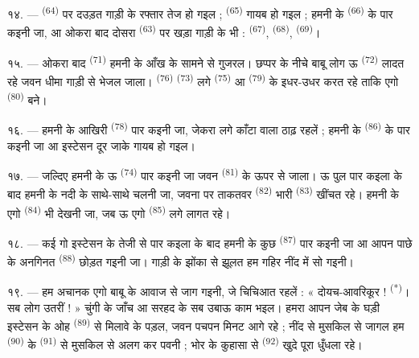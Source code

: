 \VUsaut{3.0mm}
\VUsaut{3.0mm}

१४. ---  \textsuperscript{(64)} पर दउड़त गाड़ी के रफ्तार तेज
हो गइल ;  \textsuperscript{(65)} गायब हो गइल ; हमनी के
 \textsuperscript{(66)} के पार कइनी जा, आ ओकरा बाद दोसरा
 \textsuperscript{(63)} पर खड़ा गाड़ी के भी :  \textsuperscript{(67)}, 
\textsuperscript{(68)},  \textsuperscript{(69)}।


१५. --- ओकरा बाद  \textsuperscript{(71)} हमनी के
आँख के सामने से गुजरल। छप्पर के नीचे बाबू लोग ऊ 
\textsuperscript{(72)} लादत रहे जवन धीमा गाड़ी से भेजल जाला।
 \textsuperscript{(76)} 
\textsuperscript{(73)} लगे  \textsuperscript{(75)} आ
 \textsuperscript{(79)} के इधर-उधर करत रहे ताकि एगो
 \textsuperscript{(80)} बने।

१६. --- हमनी के आखिरी  \textsuperscript{(78)} पार कइनी जा,
जेकरा लगे काँटा वाला ठाढ़ रहलें ; हमनी के 
\textsuperscript{(86)} के पार कइनी जा आ इस्टेसन दूर जाके गायब हो गइल।

१७. --- जल्दिए हमनी के ऊ  \textsuperscript{(74)} पार
कइनी जा जवन  \textsuperscript{(81)} के ऊपर से जाला। ऊ पुल पार
कइला के बाद हमनी के नदी के साथे-साथे चलनी जा, जवना पर ताकतवर
 \textsuperscript{(82)} भारी 
\textsuperscript{(83)} खींचत रहे। हमनी के एगो 
\textsuperscript{(84)} भी देखनी जा, जब ऊ एगो 
\textsuperscript{(85)} लगे लागत रहे।

१८. --- कई गो इस्टेसन के तेजी से पार कइला के बाद हमनी के कुछ
 \textsuperscript{(87)} पार कइनी जा आ आपन पाछे  के अनगिनत  \textsuperscript{(88)} छोड़त गइनी जा।
गाड़ी के झोंका से झूलत हम गहिर नींद में सो गइनी।

\VUsaut{3.0mm}
\VUsaut{3.0mm}

१९. --- हम अचानक एगो बाबू के आवाज से जाग गइनी, जे चिचिआत रहलें :
« दोयच-आवरिकूर ! \textsuperscript{(*)}। सब लोग उतरीं ! » चुंगी के जाँच आ
सरहद के सब उबाऊ काम भइल। हमरा आपन जेब के घड़ी इस्टेसन के ओह
 \textsuperscript{(89)} से मिलावे के पड़ल, जवन पचपन
मिनट आगे रहे ; नींद से मुसकिल से जागल हम 
\textsuperscript{(90)} के  \textsuperscript{(91)} से मुसकिल
से अलग कर पवनी ; भोर के कुहासा से  \textsuperscript{(92)}
खुदे पूरा धुँधला रहे।

